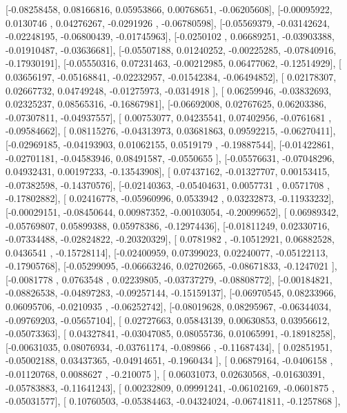\documentclass{article}
\begin{document}
       [-0.08258458,  0.08166816,  0.05953866,  0.00768651, -0.06205608],
       [-0.00095922,  0.0130746 ,  0.04276267, -0.0291926 , -0.06780598],
       [-0.05569379, -0.03142624, -0.02248195, -0.06800439, -0.01745963],
       [-0.0250102 ,  0.06689251, -0.03903388, -0.01910487, -0.03636681],
       [-0.05507188,  0.01240252, -0.00225285, -0.07840916, -0.17930191],
       [-0.05550316,  0.07231463, -0.00212985,  0.06477062, -0.12514929],
       [ 0.03656197, -0.05168841, -0.02232957, -0.01542384, -0.06494852],
       [ 0.02178307,  0.02667732,  0.04749248, -0.01275973, -0.0314918 ],
       [ 0.06259946, -0.03832693,  0.02325237,  0.08565316, -0.16867981],
       [-0.06692008,  0.02767625,  0.06203386, -0.07307811, -0.04937557],
       [ 0.00753077,  0.04235541,  0.07402956, -0.0761681 , -0.09584662],
       [ 0.08115276, -0.04313973,  0.03681863,  0.09592215, -0.06270411],
       [-0.02969185, -0.04193903,  0.01062155,  0.0519179 , -0.19887544],
       [-0.01422861, -0.02701181, -0.04583946,  0.08491587, -0.0550655 ],
       [-0.05576631, -0.07048296,  0.04932431,  0.00197233, -0.13543908],
       [ 0.07437162, -0.01327707,  0.00153415, -0.07382598, -0.14370576],
       [-0.02140363, -0.05404631,  0.0057731 ,  0.0571708 , -0.17802882],
       [ 0.02416778, -0.05960996,  0.0533942 ,  0.03232873, -0.11933232],
       [-0.00029151, -0.08450644,  0.00987352, -0.00103054, -0.20099652],
       [ 0.06989342, -0.05769807,  0.05899388,  0.05978386, -0.12974436],
       [-0.01811249,  0.02330716, -0.07334488, -0.02824822, -0.20320329],
       [ 0.0781982 , -0.10512921,  0.06882528,  0.0436541 , -0.15728114],
       [-0.02400959,  0.07399023,  0.02240077, -0.05122113, -0.17905768],
       [-0.05299095, -0.06663246,  0.02702665, -0.08671833, -0.1247021 ],
       [-0.0081778 ,  0.0763548 ,  0.02239805, -0.03737279, -0.08808772],
       [-0.00184821, -0.08826538, -0.04897283, -0.09257144, -0.15159137],
       [-0.06970545,  0.08233966,  0.06095706, -0.0210935 , -0.06252742],
       [-0.08019628,  0.08295967, -0.06344034, -0.09769203, -0.05657104],
       [ 0.02727663,  0.05843139,  0.00630853,  0.03956612, -0.05073363],
       [ 0.04327841, -0.03047085,  0.08055736,  0.01065991, -0.18918258],
       [-0.00631035,  0.08076934, -0.03761174, -0.089866  , -0.11687434],
       [ 0.02851951, -0.05002188,  0.03437365, -0.04914651, -0.1960434 ],
       [ 0.06879164, -0.0406158 , -0.01120768,  0.0088627 , -0.210075  ],
       [ 0.06031073,  0.02630568, -0.01630391, -0.05783883, -0.11641243],
       [ 0.00232809,  0.09991241, -0.06102169, -0.0601875 , -0.05031577],
       [ 0.10760503, -0.05384463, -0.04324024, -0.06741811, -0.1257868 ],
\end{document}
